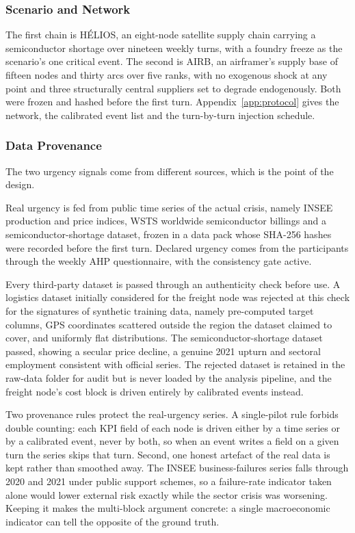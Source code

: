\subsubsection{Scenario and Network}
\label{sec:methods_scenario}

The first chain is HÉLIOS, an eight-node satellite supply chain carrying a semiconductor
shortage over nineteen weekly turns, with a foundry freeze as the scenario's one critical
event. The second is AIRB, an airframer's supply base of fifteen nodes and thirty arcs over
five ranks, with no exogenous shock at any point and three structurally central suppliers set
to degrade endogenously. Both were frozen and hashed before the first turn.
Appendix~\ref{app:protocol} gives the network, the calibrated event list and the turn-by-turn
injection schedule.

\subsubsection{Data Provenance}
\label{sec:methods_data}

The two urgency signals come from different sources, which is the point of the design.

 Real
urgency is fed from public time series of the actual crisis, namely INSEE production and
price indices, WSTS worldwide semiconductor billings and a semiconductor-shortage dataset,
frozen in a data pack whose SHA-256 hashes were recorded before the first turn. Declared
urgency comes from the participants through the weekly AHP questionnaire, with the
consistency gate active.

Every third-party dataset is passed through an authenticity check before use. A logistics
dataset initially considered for the freight node was rejected at this check for the
signatures of synthetic training data, namely pre-computed target columns, GPS coordinates
scattered outside the region the dataset claimed to cover, and uniformly flat
distributions. The semiconductor-shortage dataset passed, showing a secular price decline, a
genuine 2021 upturn and sectoral employment consistent with official series. The rejected
dataset is retained in the raw-data folder for audit but is never loaded by the analysis
pipeline, and the freight node's cost block is driven entirely by calibrated events instead.

Two provenance rules protect the real-urgency series. A single-pilot rule forbids double
counting: each KPI field of each node is driven either by a time series or by a calibrated
event, never by both, so when an event writes a field on a given turn the series skips that
turn. Second, one honest artefact of the real data is kept rather than smoothed away. The
INSEE business-failures series falls through 2020 and 2021 under public support schemes, so
a failure-rate indicator taken alone would lower external risk exactly while the sector
crisis was worsening. Keeping it makes the multi-block argument concrete: a single
macroeconomic indicator can tell the opposite of the ground truth.

